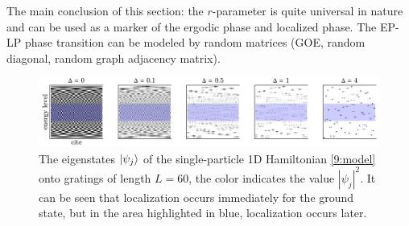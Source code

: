 The main conclusion of this section: the $r$-parameter is quite universal in nature and can be used as a marker of the ergodic phase and localized phase. The EP-LP phase transition can be modeled by random matrices (GOE, random diagonal, random graph adjacency matrix).





\begin{figure}[h]
    \centering
    \includegraphics{imgs/evecs.pdf}
    \caption{
    The eigenstates $\left| \psi_j \right\rangle$ of the single-particle 1D Hamiltonian \eqref{9:model} onto gratings of length $L=60$, the color indicates the value $|\psi_j|^2$. It can be seen that localization occurs immediately for the ground state, but in the area highlighted in blue, localization occurs later.
    }
    \label{fig:loc1}
\end{figure}
